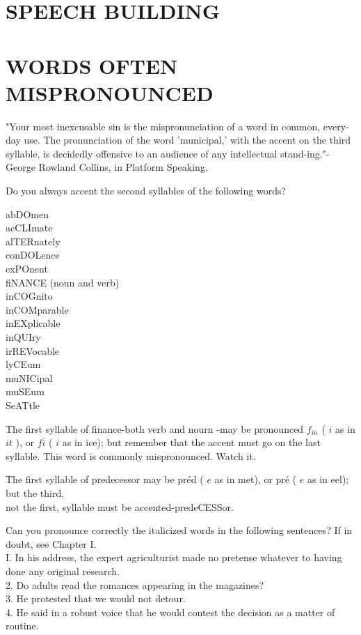 \documentclass[10pt]{article}
\begin{document}
\section*{SPEECH BUILDING}
\section*{WORDS OFTEN MISPRONOUNCED}
\begin{displayquote}
"Your most inexcusable sin is the mispronunciation of a word in common, every-day use. The pronunciation of the word 'municipal,' with the accent on the third syllable, is decidedly offensive to an audience of any intellectual stand-ing."-George Rowland Collins, in Platform Speaking.
\end{displayquote}

Do you always accent the second syllables of the following words?

\begin{displayquote}
abDOmen\\
acCLImate\\
alTERnately\\
conDOLence\\
exPOnent\\
fiNANCE (noun and verb)\\
inCOGnito\\
inCOMparable\\
inEXplicable\\
inQUIry\\
irREVocable\\
lyCEum\\
muNICipal\\
muSEum\\
SeATtle
\end{displayquote}

The first syllable of finance-both verb and nourn -may be pronounced $f_{i n}$ ( $i$ as in $i t$ ), or $f \bar{i}$ ( $i$ as in ice); but remember that the accent must go on the last syllable. This word is commonly mispronounced. Watch it.

The first syllable of predecessor may be préd ( $e$ as in met), or pré ( $e$ as in eel); but the third,\\
not the first, syllable must be accented-predeCESSor.

Can you pronounce correctly the italicized words in the following sentences? If in doubt, see Chapter I.\\
I. In his address, the expert agriculturist made no pretense whatever to having done any original research.\\
2. Do adults read the romances appearing in the magazines?\\
3. He protested that we would not detour.\\
4. He said in a robust voice that he would contest the decision as a matter of routine.
\end{document}

